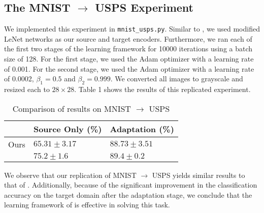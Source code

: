 \documentclass[14pt]{extarticle}
\begin{document}
		\subsection{The MNIST $\rightarrow$ USPS Experiment}
		We implemented this experiment in \texttt{mnist\_usps.py}. Similar to \cite{adda}, we used modified LeNet networks as our source and target encoders. Furthermore, we ran each of the first two stages of the learning framework for 10000 iterations using a batch size of 128. For the first stage, we used the Adam optimizer with a learning rate of 0.001. For the second stage, we used the Adam optimizer with a learning rate of 0.0002, $\beta_1 = 0.5$ and $\beta_2 = 0.999$. We converted all images to grayscale and resized each to $28 \times 28$. Table 1 shows the results of this replicated experiment.
		\begin{table}[H]
			\centering
			\begin{tabular}{|P{40mm}|P{40mm}|P{40mm}|}
				\hline
				 & Source Only (\%) & Adaptation (\%)\\
				\hline
				Ours & $65.31 \pm 3.17$ & $88.73 \pm 3.51$\\
				\hline
				\cite{adda} & $75.2 \pm 1.6$ & $89.4 \pm 0.2$\\
				\hline
			\end{tabular}
			\caption{Comparison of results on MNIST $\rightarrow$ USPS}
		\end{table}
		We observe that our replication of MNIST $\rightarrow$ USPS yields similar results to that of \cite{adda}. Additionally, because of the significant improvement in the classification accuracy on the target domain after the adaptation stage, we conclude that the learning framework of \cite{adda} is effective in solving this task.
	
	
\end{document}
